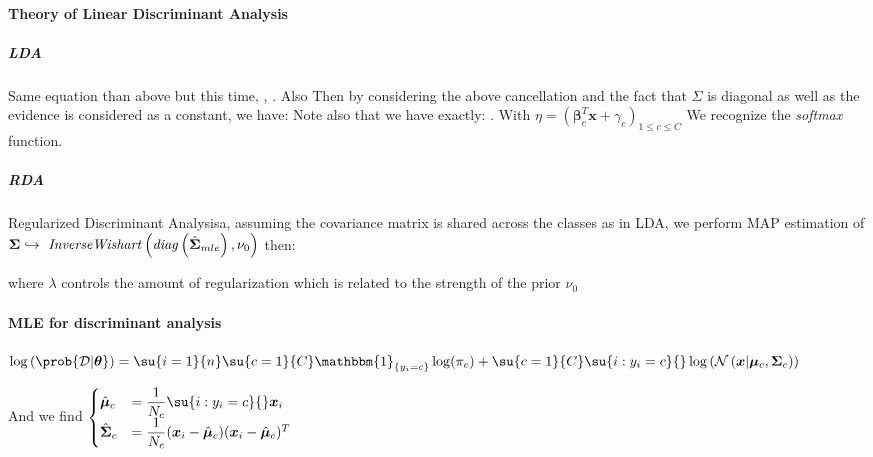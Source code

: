 \paragraph{Theory of Linear Discriminant Analysis}
\subparagraph{LDA}
Same equation than above but this time, , . Also 
Then by considering the above cancellation and the fact that $\Sigma$ is diagonal as 
well as the evidence is considered as a constant, we have:
Note also that we have exactly: . With $\eta=\left(
\bm{\beta}^{T}_{c}\bm{x} +\gamma_{c}\right)_{1\leq c\leq C}$
We recognize the \emph{softmax} function.
\subparagraph{RDA}
Regularized Discriminant Analysisa, assuming the covariance matrix is shared across the classes as in
LDA, we perform MAP estimation of $\bm{\Sigma}\hookrightarrow\text{ \emph{InverseWishart}}\left(
\text{\emph{diag}}\left(\hat{\bm{\Sigma}}_{mle}\right), \nu_{0}\right)$ then:
\begin{center}
\end{center}
where $\lambda$ controls the amount of regularization which is related to the strength of the prior
$\nu_{0}$

\paragraph{MLE for discriminant analysis}
\begin{center}
    $\log\left(\prob{\mathcal{D}|\bm{\theta}}\right) = \su{i=1}{n}\su{c=1}{C}\mathbbm{1}_{\{y_{i}=c
    \}}\log(\pi_{c}) + \su{c=1}{C}\su{i:y_{i}=c}{}\log\left(\mathcal{N}\left(\bm{x}|\bm{\mu}_{c},
    \bm{\Sigma}_{c}\right)\right)$
\end{center}
And we find 
$\begin{cases}
    \hat{\bm{\mu}}_{c} &= \dfrac{1}{N_{c}}\su{i:y_{i}=c}{}\bm{x}_{i} \\
    \hat{\bm{\Sigma}}_{c} &= \dfrac{1}{N_{c}}(\bm{x}_{i}-\hat{\bm{\mu}}_{c})(\bm{x}_{i}-
    \hat{\bm{\mu}}_{c})^{T}
\end{cases}$

